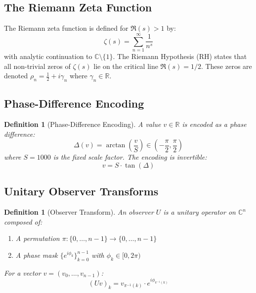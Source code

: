 \documentclass[11pt,a4paper]{article}
\newtheorem{definition}[theorem]{Definition}
\theoremstyle{remark}
\begin{document}
\subsection{The Riemann Zeta Function}

The Riemann zeta function is defined for $\Re(s) > 1$ by:
\begin{equation}
    \zeta(s) = \sum_{n=1}^{\infty} \frac{1}{n^s}
\end{equation}
with analytic continuation to $\mathbb{C} \setminus \{1\}$. The Riemann Hypothesis (RH) states that all non-trivial zeros of $\zeta(s)$ lie on the critical line $\Re(s) = 1/2$. These zeros are denoted $\rho_n = \frac{1}{2} + i\gamma_n$ where $\gamma_n \in \mathbb{R}$.

\subsection{Phase-Difference Encoding}

\begin{definition}[Phase-Difference Encoding]
A value $v \in \mathbb{R}$ is encoded as a phase difference:
\begin{equation}
    \Delta(v) = \arctan\left(\frac{v}{S}\right) \in \left(-\frac{\pi}{2}, \frac{\pi}{2}\right)
\end{equation}
where $S = 1000$ is the fixed scale factor. The encoding is invertible:
\begin{equation}
    v = S \cdot \tan(\Delta)
\end{equation}
\end{definition}

\subsection{Unitary Observer Transforms}

\begin{definition}[Observer Transform]
An observer $U$ is a unitary operator on $\mathbb{C}^n$ composed of:
\begin{enumerate}[label=(\roman*)]
    \item A permutation $\pi: \{0,\ldots,n-1\} \to \{0,\ldots,n-1\}$
    \item A phase mask $\{e^{i\phi_k}\}_{k=0}^{n-1}$ with $\phi_k \in [0,2\pi)$
\end{enumerate}
For a vector $v = (v_0,\ldots,v_{n-1})$:
\begin{equation}
    (Uv)_k = v_{\pi^{-1}(k)} \cdot e^{i\phi_{\pi^{-1}(k)}}
\end{equation}
\end{definition}
\end{document}
